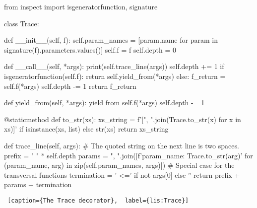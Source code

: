 \begin{minipage}{\linewidth} \largev \hrulefill
\begin{python}[numbers=left]
from inspect import isgeneratorfunction, signature

class Trace:

    def __init__(self, f):
        self.param_names = [param.name for param in signature(f).parameters.values()]
        self.f = f
        self.depth = 0

    def __call__(self, *args):
        print(self.trace_line(args))
        self.depth += 1
        if isgeneratorfunction(self.f):
            return self.yield_from(*args)
        else:
            f_return = self.f(*args)
            self.depth -= 1
            return f_return

    def yield_from(self, *args):
        yield from self.f(*args)
        self.depth -= 1

    @staticmethod
    def to_str(xs):
        xs_string = f'[{", ".join(Trace.to_str(x) for x in xs)}]' if isinstance(xs, list) else str(xs)
        return xs_string

    def trace_line(self, args):
        # The quoted string on the next line is two spaces.
        prefix = "  " * self.depth
        params = ", ".join([f'{param_name}: {Trace.to_str(arg)}'
                            for (param_name, arg) in zip(self.param_names, args)])
        # Special case for the transversal functions
        termination = ' <=' if not args[0] else ''
        return prefix + params + termination

\end{python}

\begin{lstlisting} [caption={The Trace decorator},  label={lis:Trace}]
\end{lstlisting}
\end{minipage}

